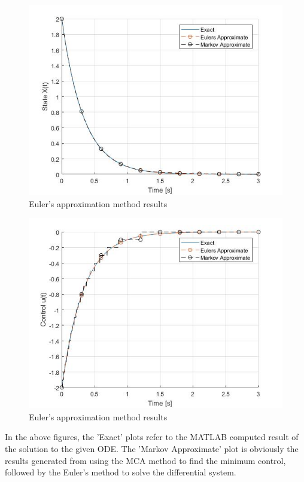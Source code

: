 \documentclass[11pt,draftd]{article}
\begin{document}
\begin{figure}[h!]
	\centering
	\label{eulersmethod1}
	\includegraphics[scale = 0.6]{images/EulersApproximateState}
	\caption{Euler's approximation method results}
\end{figure}
\begin{figure}[h!]
	\centering
	\label{eulersmethod2}
	\includegraphics[scale = 0.6]{images/EulersApproximateControl}
	\caption{Euler's approximation method results}
\end{figure}

In the above figures, the 'Exact' plots refer to the MATLAB computed result of the solution to the given ODE. The 'Markov Approximate' plot is obviously the results generated from using the MCA method to find the minimum control, followed by the Euler's method to solve the differential system.
\end{document}

